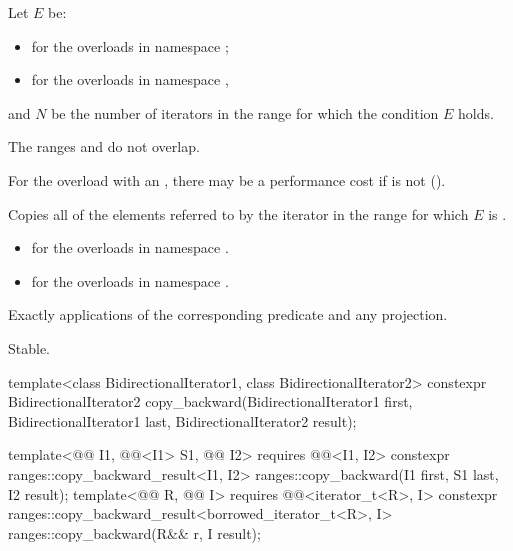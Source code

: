 \begin{itemdescr}
\pnum
Let $E$ be:
\begin{itemize}
\item
  for the overloads in namespace ;
\item
  for the overloads in namespace ,
\end{itemize}
and $N$ be the number of iterators  in the range 
for which the condition $E$ holds.

\pnum
\expects
The ranges  and 
do not overlap.
\begin{note}
For the overload with an ,
there may be a performance cost
if 
is not  ().
\end{note}

\pnum
\effects
Copies all of the elements referred to
by the iterator  in the range 
for which $E$ is .

\pnum
\returns
\begin{itemize}
\item
  for the overloads in namespace .
\item
  for the overloads in namespace .
\end{itemize}

\pnum
\complexity
Exactly  applications
of the corresponding predicate and any projection.

\pnum
\remarks
Stable.
\end{itemdescr}

%
\begin{itemdecl}
template<class BidirectionalIterator1, class BidirectionalIterator2>
  constexpr BidirectionalIterator2
    copy_backward(BidirectionalIterator1 first,
                  BidirectionalIterator1 last,
                  BidirectionalIterator2 result);

template<@@ I1, @@<I1> S1, @@ I2>
  requires @@<I1, I2>
  constexpr ranges::copy_backward_result<I1, I2>
    ranges::copy_backward(I1 first, S1 last, I2 result);
template<@@ R, @@ I>
  requires @@<iterator_t<R>, I>
  constexpr ranges::copy_backward_result<borrowed_iterator_t<R>, I>
    ranges::copy_backward(R&& r, I result);
\end{itemdecl}

